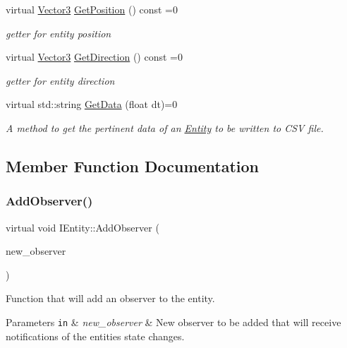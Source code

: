 \begin{DoxyCompactItemize}
virtual \hyperlink{classVector3}{Vector3} \hyperlink{classIEntity_a9bc32587aab91761fc0e718612498199}{Get\+Position} () const =0
\begin{DoxyCompactList}\small\item\em getter for entity position \end{DoxyCompactList}\item 
virtual \hyperlink{classVector3}{Vector3} \hyperlink{classIEntity_aa99a8fef8b22195a5113c38ef51f086d}{Get\+Direction} () const =0
\begin{DoxyCompactList}\small\item\em getter for entity direction \end{DoxyCompactList}\item 
virtual std\+::string \hyperlink{classIEntity_a4d9355e68c6be349f57dc67fc1c036ba}{Get\+Data} (float dt)=0
\begin{DoxyCompactList}\small\item\em A method to get the pertinent data of an \hyperlink{classEntity}{Entity} to be written to C\+SV file. \end{DoxyCompactList}\end{DoxyCompactItemize}


\subsection{Member Function Documentation}
\mbox{\label{classIEntity_a0d682e3663a78b6b5fd3df8cd51aa321}} 
\subsubsection{\texorpdfstring{Add\+Observer()}{AddObserver()}}
{\footnotesize\ttfamily virtual void I\+Entity\+::\+Add\+Observer (\begin{DoxyParamCaption}\item[{\hyperlink{classIObserver}{I\+Observer} $\ast$}]{new\+\_\+observer }\end{DoxyParamCaption})\hspace{0.3cm}{\ttfamily [pure virtual]}}



Function that will add an observer to the entity. 


\begin{DoxyParams}[1]{Parameters}
\mbox{\tt in}  & {\em new\+\_\+observer} & New observer to be added that will receive notifications of the entities state changes. \\
\hline
\end{DoxyParams}


